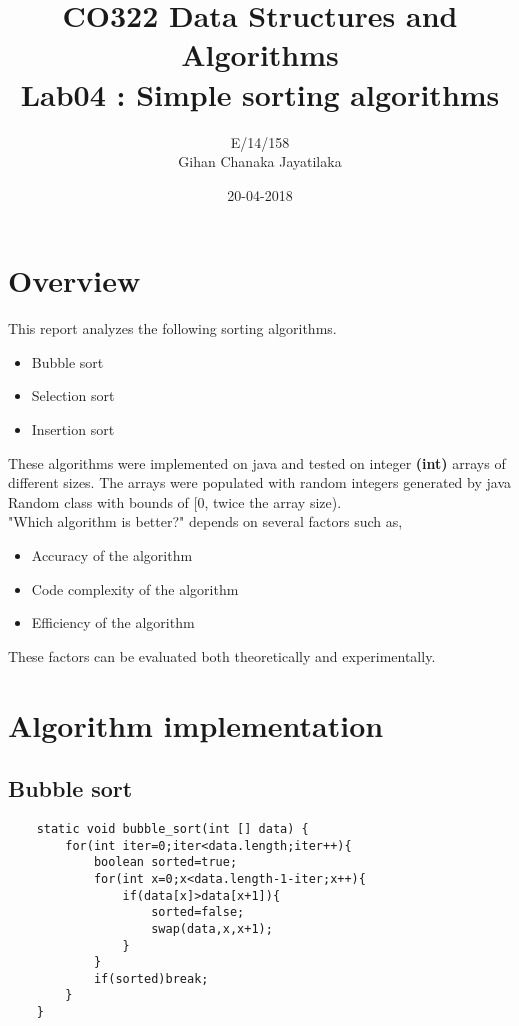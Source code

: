 \documentclass[11pt]{article}
\title{\textbf{CO322 Data Structures and Algorithms\\Lab04 : Simple sorting algorithms}}
\author{E/14/158\\
		Gihan Chanaka Jayatilaka}
\date{20-04-2018}
\begin{document}
\maketitle
\clearpage

\tableofcontents
\clearpage

\section{Overview}

This report analyzes the following sorting algorithms.
\begin{itemize}
\item Bubble sort
\item Selection sort
\item Insertion sort
\end{itemize}

These algorithms were implemented on java and tested on integer \textbf{(int)} arrays of different sizes. The arrays were populated with random integers generated by java Random class with bounds of [0, twice the array size).\\

"Which algorithm is better?" depends on several factors such as,
\begin{itemize}
\item Accuracy of the algorithm
\item Code complexity of the algorithm
\item Efficiency of the algorithm
\end{itemize}

These factors can be evaluated both theoretically and experimentally.


\section{Algorithm implementation}
\subsection{Bubble sort}

\begin{lstlisting}
    static void bubble_sort(int [] data) {
        for(int iter=0;iter<data.length;iter++){
            boolean sorted=true;
            for(int x=0;x<data.length-1-iter;x++){
                if(data[x]>data[x+1]){
                    sorted=false;
                    swap(data,x,x+1);
                }
            }
            if(sorted)break;
        }
    }
\end{lstlisting}
\end{document}
